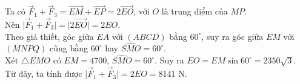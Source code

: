 \begin{bt}
{\begin{center}
		\end{center}
			Ta có  $\overrightarrow{F}_1+\overrightarrow{F}_3=\overrightarrow{EM}+\overrightarrow{EP}=2\overrightarrow{EO}$, với $O$ là trung điểm của $MP$.\\
		Nên 
		 $\big|\overrightarrow{F}_1+\overrightarrow{F}_3\big|=\big|2\overrightarrow{EO}\big|=2EO$.\\
			Theo giả thiết, góc giữa $EA$ với $(ABCD)$ bằng $60^\circ$, suy ra góc giữa $EM$ với $(MNPQ)$ cũng bằng $60^\circ$ hay $\widehat{SMO}=60^\circ$.\\
			Xét $\triangle EMO$ có $EM=4700$, $\widehat{SMO}=60^\circ$. Suy ra $EO = EM \sin 60^\circ = 2350\sqrt{3}$.\\
			Từ đây, ta tính được $\big|\overrightarrow{F}_1+\overrightarrow{F}_3\big|=2EO=8141$ N.
		}
\end{bt}

